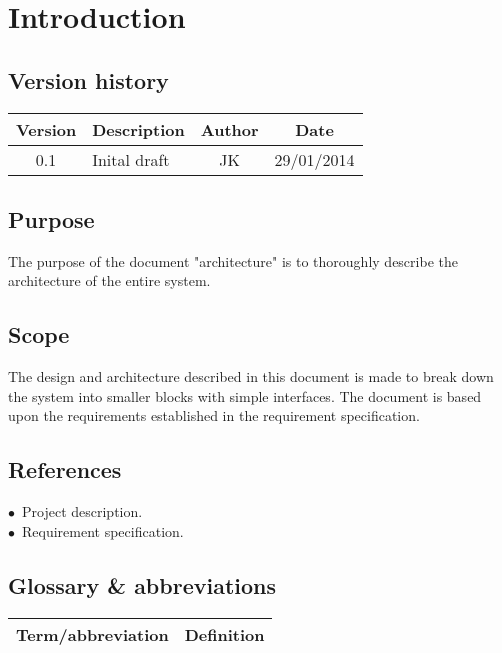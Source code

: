 \chapter{Introduction}
\section{Version history}
\begin{table}[H]
\begin{tabular}{|c|p{9cm}|c|c|}
\hline
Version & Description & Author & Date\\
\hline
0.1 & Inital draft & JK & 29/01/2014\\
\hline
\end{tabular}
\end{table}

\section{Purpose}
The purpose of the document "architecture" is to thoroughly describe the architecture of the entire system.

\section{Scope}
The design and architecture described in this document is made to break down the system into smaller blocks with simple interfaces. The document is based upon the requirements established in the requirement specification.

\section{References}
$\bullet$\ Project description.\\
$\bullet$\ Requirement specification.\\



\section{Glossary \& abbreviations}
\begin{table}[H]
\centering
\begin{tabular}{|p{4cm}|p{7cm}|}
\hline
Term/abbreviation & Definition\\ \hline
\end{tabular}
\end{table}
